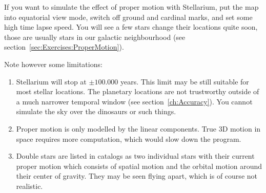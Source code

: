 If you want to simulate the effect of proper motion with Stellarium,
put the map into equatorial view mode, switch off ground and cardinal
marks, and set some high time lapse speed. You will see a few stars
change their locations quite soon, those are usually stars in our
galactic neighbourhood (see section~\ref{sec:Exercises:ProperMotion}).

Note however some limitations:
\begin{enumerate}
\item Stellarium will stop at $\pm 100.000$ years. This limit may be
  still suitable for most stellar locations. The planetary locations
  are not trustworthy outside of a much narrower temporal window (see
  section~\ref{ch:Accuracy}). You cannot simulate the sky over the
  dinosaurs or such things.
\item Proper motion is only modelled by the linear components. True 3D
  motion in space requires more computation, which would slow down the
  program.
\item Double stars are listed in catalogs as two individual stars with
  their current proper motion which consists of spatial motion and the 
  orbital motion around their center of gravity. They may be seen flying 
  apart, which is of course not realistic.
\end{enumerate}

